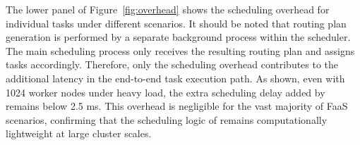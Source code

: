 The lower panel of Figure~\ref{fig:overhead} shows the scheduling overhead for individual 
tasks under different scenarios. It should be noted that 
routing plan generation is performed by a separate background process within 
the scheduler. The main scheduling process only receives the resulting routing 
plan and assigns tasks accordingly. Therefore, only the scheduling overhead 
contributes to the additional latency in the end-to-end 
task execution path. As shown, even with 1024 worker nodes under heavy load, the
extra scheduling delay added by \sysname remains below 2.5 ms. This overhead is 
negligible for the vast majority of FaaS scenarios, confirming that the scheduling logic of \sysname remains computationally lightweight at large cluster scales.

